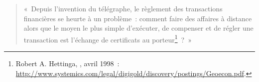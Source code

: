 \begin{quote}
«~Depuis l'invention du télégraphe, le règlement des transactions financières se heurte à un problème~: comment faire des affaires à distance alors que le moyen le plus simple d'exécuter, de compenser et de régler une transaction est l'échange de certificats au porteur\footnote{Robert A. Hettinga, , avril 1998~: \url{http://www.systemics.com/legal/digigold/discovery/postings/Geoecon.pdf}.}~?~»
\end{quote} %


